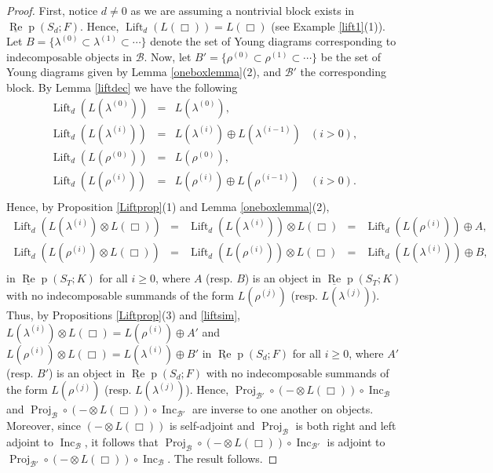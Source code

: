 \documentclass{amsart}
\theoremstyle{definition}
\def\uRep{\underline{\operatorname{Re}}\!\operatorname{p}}
\newcommand{\Lift}{\operatorname{Lift}}
\newcommand{\Inc}{\operatorname{Inc}}
\newcommand{\Proj}{\operatorname{Proj}}
\renewcommand{\1}{_{(1)}}
\renewcommand{\2}{_{(2)}}
\newcommand{\3}{_{(3)}}
\newcommand{\4}{_{(4)}}
\newcommand{\cat}{\mathcal}
\begin{document}
\begin{proof} First, notice $d\not=0$ as we are assuming a nontrivial block exists in $\uRep(S_d; F)$.  Hence, $\Lift_d(L(\Box))=L(\Box)$ (see Example \ref{lift1}(1)).  Let $B=\{\lambda^{(0)}\subset\lambda^{(1)}\subset\cdots\}$ denote the set of Young diagrams corresponding to indecomposable objects in $\cat{B}$. Now, let $B'=\{\rho^{(0)}\subset\rho^{(1)}\subset\cdots\}$  be the set of Young diagrams given by Lemma \ref{oneboxlemma}(2), and $\cat{B}'$ the corresponding block.  By Lemma \ref{liftdec} we have the following $$\begin{array}{rcll}
\Lift_d(L(\lambda^{(0)})) & = & L(\lambda^{(0)}),\\
\Lift_d(L(\lambda^{(i)}))&=&L(\lambda^{(i)})\oplus L(\lambda^{(i-1)})&(i>0),\\
\Lift_d(L(\rho^{(0)}))&=&L(\rho^{(0)}),\\
\Lift_d(L(\rho^{(i)}))&=&L(\rho^{(i)})\oplus L(\rho^{(i-1)})& (i>0).\\
\end{array}$$
Hence, by Proposition \ref{Liftprop}(1) and Lemma \ref{oneboxlemma}(2), 
$$\begin{array}{rrcll}
\Lift_d(L(\lambda^{(i)})\otimes L(\Box))&=&\Lift_d(L(\lambda^{(i)}))\otimes L(\Box)&=&\Lift_d(L(\rho^{(i)}))\oplus A,\\
\Lift_d(L(\rho^{(i)})\otimes L(\Box))&=&\Lift_d(L(\rho^{(i)}))\otimes L(\Box)&=&\Lift_d(L(\lambda^{(i)}))\oplus B,\\
\end{array}$$ in $\uRep(S_T; K)$ for all $i\geq0$, where $A$ (resp. $B$) is an object in $\uRep(S_T; K)$ with no indecomposable summands of the form $L(\rho^{(j)})$ (resp. $L(\lambda^{(j)})$).  Thus, by Propositions \ref{Liftprop}(3) and \ref{liftsim}, 
$L(\lambda^{(i)})\otimes L(\Box)=L(\rho^{(i)})\oplus A'$ and $L(\rho^{(i)})\otimes L(\Box)=L(\lambda^{(i)})\oplus B'$  in $\uRep(S_d; F)$ for all $i\geq 0$, where $A'$ (resp. $B'$) is an object in $\uRep(S_d; F)$ with no indecomposable summands of the form $L(\rho^{(j)})$ (resp. $L(\lambda^{(j)})$).  Hence, $\Proj_{\cat{B}'}\circ(-\otimes L(\Box))\circ\Inc_{\cat{B}}$  and $\Proj_\cat{B}\circ(-\otimes L(\Box))\circ\Inc_{\cat{B}'}$ are inverse to one another on objects.  Moreover, since $(-\otimes L(\Box))$ is self-adjoint and $\Proj_\cat{B}$ is both right and left adjoint to $\Inc_{\cat{B}}$, it follows that $\Proj_\cat{B}\circ(-\otimes L(\Box))\circ\Inc_{\cat{B}'}$ is adjoint to $\Proj_{\cat{B}'}\circ(-\otimes L(\Box))\circ\Inc_{\cat{B}}$.  The result follows.
\end{proof}
\end{document}
